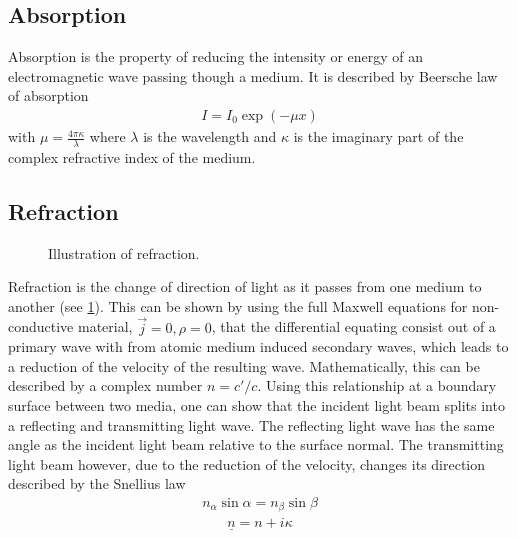 \subsection{Absorption}
%
Absorption is the property of reducing the intensity or energy of an electromagnetic wave passing though a medium.
It is described by Beersche law of absorption
% 
\begin{align}
    I = I_0 \exp(-\mu x)
\end{align}
%
with $\mu = \frac{4\pi \kappa}{\lambda}$ where $\lambda$ is the wavelength and $\kappa$ is the imaginary part of the complex refractive index of the medium.
%
\subsection{Refraction}
%
\begin{figure}[!t]
\centering
\setlength{\tikzwidth}{\textwidth}
\label{fig:optic_refraction}
\caption{Illustration of refraction.}
\end{figure}
%
Refraction is the change of direction of light as it passes from one medium to another (see \cref{fig:optic_refraction}).
This can be shown by using the full Maxwell equations  for non-conductive material, \ie{} $\vec{j} = 0, \rho = 0$, that the differential equating consist out of a primary wave with from atomic medium induced secondary waves, which leads to a reduction of the velocity of the resulting wave.
Mathematically, this can be described by a complex number $n = c' / c$.
Using this relationship at a boundary surface between two media, one can show that the incident light beam splits into a reflecting and transmitting light wave.
The reflecting light wave has the same angle as the incident light beam relative to the surface normal.
The transmitting light beam however, due to the reduction of the velocity, changes its direction described by the Snellius law
\begin{align}
    n_\alpha \sin \alpha = n_\beta \sin \beta \label{eq:Snellius}
\end{align}
%
\begin{align}
\underline{n} = n + i\kappa
\end{align}
% 
%
%
